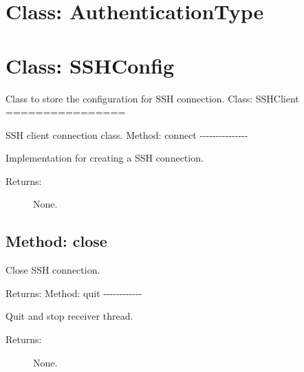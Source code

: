 %
%

\hypertarget{qconnectbase-tcp/ssh-ssh-client-class-authenticationtype-61}{%
\section{Class: AuthenticationType}\label{qconnectbase-tcp/ssh-ssh-client-class-authenticationtype-61}}

\begin{Shaded}
\begin{Highlighting}[]
\OperatorTok{/}
\end{Highlighting}
\end{Shaded}

\hypertarget{qconnectbase-tcp/ssh-ssh-client-class-sshconfig-62}{%
\section{Class: SSHConfig}\label{qconnectbase-tcp/ssh-ssh-client-class-sshconfig-62}}

\begin{Shaded}
\begin{Highlighting}[]
\OperatorTok{/}
\end{Highlighting}
\end{Shaded}

Class to store the configuration for SSH connection. Class: SSHClient
================

\begin{Shaded}
\begin{Highlighting}[]
\OperatorTok{/}
\end{Highlighting}
\end{Shaded}

SSH client connection class. Method: connect
-\/-\/-\/-\/-\/-\/-\/-\/-\/-\/-\/-\/-\/-\/-

Implementation for creating a SSH connection.

\begin{description}
\item[Returns:]
None.
\end{description}

\hypertarget{qconnectbase-tcp/ssh-ssh-client-method-close-63}{%
\subsection{Method: close}\label{qconnectbase-tcp/ssh-ssh-client-method-close-63}}

Close SSH connection.

Returns: Method: quit -\/-\/-\/-\/-\/-\/-\/-\/-\/-\/-\/-

Quit and stop receiver thread.

\begin{description}
\item[Returns:]
None.
\end{description}
